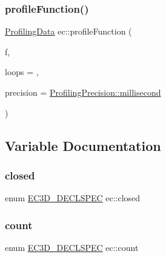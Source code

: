 \subsubsection{\texorpdfstring{profile\+Function()}{profileFunction()}}
{\footnotesize\ttfamily \mbox{\hyperlink{structec_1_1_profiling_data}{Profiling\+Data}} ec\+::profile\+Function (\begin{DoxyParamCaption}\item[{const std\+::function$<$ void()$>$ \&}]{f,  }\item[{unsigned int}]{loops = {},  }\item[{Profiling\+Precision}]{precision = {\ttfamily \mbox{\hyperlink{_profiler_8h_ad14d98cdcfa4397ac3a0af6ce942c55d}{Profiling\+Precision\+::millisecond}}} }\end{DoxyParamCaption})}



\subsection{Variable Documentation}
\mbox{\label{namespaceec_a50f9b2ea9dbfffe311ceb6f857573272}} 
\subsubsection{\texorpdfstring{closed}{closed}}
{\footnotesize\ttfamily enum \mbox{\hyperlink{_common_8h_aac42573e202ca3dd4d259c81691e2369}{E\+C3\+D\+\_\+\+D\+E\+C\+L\+S\+P\+EC}} ec\+::closed\hspace{0.3cm}{\ttfamily [strong]}}

\mbox{\label{namespaceec_a4dc8d59c4e90842e057344aefde0efbd}} 
\subsubsection{\texorpdfstring{count}{count}}
{\footnotesize\ttfamily enum \mbox{\hyperlink{_common_8h_aac42573e202ca3dd4d259c81691e2369}{E\+C3\+D\+\_\+\+D\+E\+C\+L\+S\+P\+EC}} ec\+::count\hspace{0.3cm}{\ttfamily [strong]}}

\mbox{\label{namespaceec_a7d6502eddc910822e32f6ba96543bb05}} 
